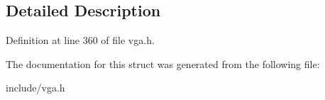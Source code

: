 \subsection{Detailed Description}


Definition at line 360 of file vga.\-h.



The documentation for this struct was generated from the following file\-:\begin{DoxyCompactItemize}
\item 
include/vga.\-h\end{DoxyCompactItemize}
